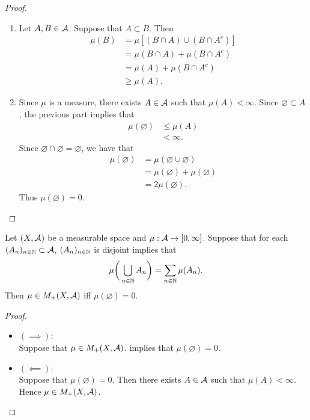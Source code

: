 \documentclass{book}
\begin{document}
	\begin{proof}\
		\begin{enumerate}
			\item Let $A, B \in \mathcal{A}$. Suppose that $A \subset B$. Then
			\begin{align*}
				\mu(B)
				& = \mu[(B \cap A) \cup (B \cap A^c)] \\
				& = \mu(B \cap A) + \mu(B \cap A^c) \\
				& = \mu(A) + \mu(B \cap A^c) \\ 
				& \geq \mu(A).
			\end{align*}
			\item Since $\mu$ is a measure, there exists $A \in \mathcal{A}$ such that $\mu(A)< \infty$. Since $\varnothing \subset A$, the previous part implies that 
			\begin{align*}
				\mu(\varnothing)
				& \leq \mu(A) \\
				& < \infty. 
			\end{align*}
			Since $\varnothing \cap \varnothing = \varnothing$, we have that
			\begin{align*}
				\mu(\varnothing) 
				& = \mu(\varnothing \cup \varnothing) \\
				& = \mu(\varnothing) + \mu(\varnothing) \\
				& = 2 \mu(\varnothing). 
			\end{align*}
			Thus $\mu(\varnothing) = 0$.
		\end{enumerate}
	\end{proof}
	
	\begin{ex} 
		Let $(X,\mathcal{A})$ be a measurable space and $\mu: \mathcal{A} \rightarrow [0,\infty]$. Suppose that for each $(A_n)_{n \in \mathbb{N}} \subset \mathcal{A}$, $(A_n)_{n \in \mathbb{N}}$ is disjoint implies that 
		$$\mu\bigg(\bigcup_{n \in \mathbb{N}}A_n \bigg) = \sum\limits_{n \in \mathbb{N}}\mu(A_n).$$
		Then $\mu \in M_+(X, \mathcal{A})$ iff $\mu(\varnothing) = 0$.
	\end{ex}

	\begin{proof}\
		\begin{itemize}
			\item $(\implies):$ \\
			Suppose that $\mu \in M_+(X, \mathcal{A})$.  implies that $\mu(\varnothing) = 0$.
			\item $(\impliedby):$ \\
			Suppose that $\mu(\varnothing) = 0$. Then there exists $A \in \mathcal{A}$ such that $\mu(A) < \infty$. Hence $\mu \in M_+(X, \mathcal{A})$.
		\end{itemize}
	\end{proof}
	
\end{document}
